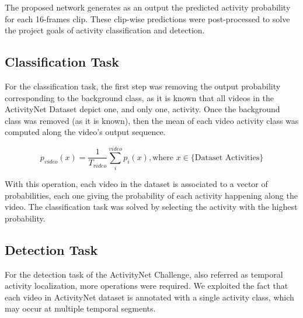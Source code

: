 The proposed network generates as an output the predicted activity probability for each 16-frames clip. 
These clip-wise predictions were post-processed to solve the project goals of activity classification and detection.


\subsection{Classification Task}

For the classification task, the first step was removing the output probability corresponding to the background class, as it is known that all videos in the ActivityNet Dataset depict one, and only one, activity. Once the background class was removed (as it is known), then the mean of each video activity class was computed along the video's output sequence.

\begin{equation}
	p_{video}(x) = \frac{1}{T_{video}} \sum_i^{video} p_i(x), \text{where } x \in \{ \text{Dataset Activities}\}
\end{equation}

With this operation, each video in the dataset is associated to a vector of probabilities, each one giving the probability of each activity happening along the video. The classification task was solved by selecting the activity with the highest probability.

\subsection{Detection Task}

For the detection task of the ActivityNet Challenge, also referred as temporal activity localization, more operations were required. We exploited the fact that each video in ActivityNet dataset is annotated with a single activity class, which may occur at multiple temporal segments. %

